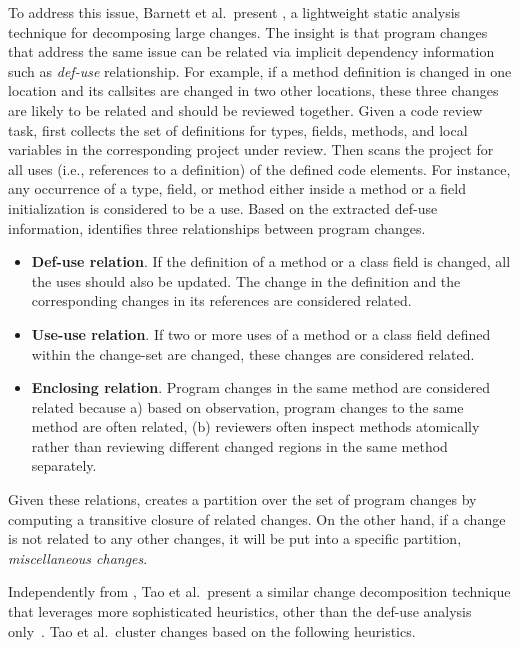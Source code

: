 \documentclass[runningheads,a4paper]{llncs}
\begin{document}
To address this issue, Barnett et al.~present {\clusterchanges}, a lightweight static analysis technique for decomposing large changes. The insight is that program changes that address the same issue can be related via implicit dependency information such as {\em def-use} relationship. For example, if a method definition is changed in one location and its callsites are changed in two other locations, these three changes are likely to be related and should be reviewed together. Given a code review task, {\clusterchanges} first collects the set of definitions for types, fields, methods, and local variables in the corresponding project under review. Then {\clusterchanges} scans the project for all uses (i.e., references to a definition) of the defined code elements. For instance, any occurrence of a type, field, or method either inside a method or a field initialization is considered to be a use. Based on the extracted def-use information, {\clusterchanges} identifies three relationships between program changes. 

\begin{itemize}
 \item {\bf Def-use relation}. If the definition of a method or a class field is changed, all the uses should also be updated. The change in the definition and the corresponding changes in its references are considered related.
 \item {\bf Use-use relation}. If two or more uses of a method or a class field defined within the change-set are changed, these changes are considered related. 
 \item {\bf Enclosing relation}. Program changes in the same method are considered related because a) based on observation, program changes to the same method are often related, (b) reviewers often inspect methods atomically rather than reviewing different changed regions in the same method separately.
\end{itemize}

Given these relations, {\clusterchanges} creates a partition over the set of program changes by computing a transitive closure of related changes. On the other hand, if a change is not related to any other changes, it will be put into a specific partition, {\em miscellaneous changes}.

Independently from {\clusterchanges}, Tao et al.~present a similar change decomposition technique that leverages more sophisticated heuristics, other than the def-use analysis only~\cite{tao2015partitioning}. Tao et al.~cluster changes based on the following heuristics.
\end{document}

